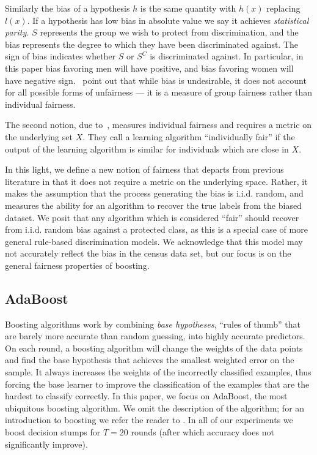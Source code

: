 \documentclass{article}
\begin{document}
Similarly the bias of a hypothesis $h$ is the same quantity with $h(x)$
replacing $l(x)$. If a hypothesis has low bias in absolute value we say it
achieves \emph{statistical parity.} $S$ represents the group we wish to protect
from discrimination, and the bias represents the degree to which they have been
discriminated against.  The sign of bias indicates whether $S$ or $S^C$ is
discriminated against.  In particular, in this paper bias favoring men will
have positive, and bias favoring women will have negative
sign.~\citet{DworkHPR12} point out that while bias is undesirable, it does not
account for all possible forms of unfairness --- it is a measure of group
fairness rather than individual fairness.

The second notion, due to~\citet{DworkHPR12},
measures individual fairness and requires a metric on the underlying set $X$.
They call a learning algorithm ``individually fair'' if the output of the
learning algorithm is similar for individuals which are close in $X$. 

In this light, we define a new notion of fairness that departs from
previous literature in that it does not require a metric on the underlying
space. Rather, it makes the assumption that the process generating the bias is
i.i.d. random, and measures the ability for an algorithm to recover the true
labels from the biased dataset. We posit that any algorithm which is considered
``fair'' should recover from i.i.d. random bias against a protected class,
as this is a special case of more general rule-based discrimination models. We
acknowledge that this model may not accurately reflect the bias in the census
data set, but our focus is on the general fairness properties of boosting.

\subsection{AdaBoost}

Boosting algorithms work by combining \emph{base hypotheses}, ``rules of
thumb'' that are barely more accurate than random guessing, into highly
accurate predictors.  On each round, a boosting algorithm will change the
weights of the data points and find the base hypothesis that achieves the
smallest weighted error on the sample.  It always increases the weights of the
incorrectly classified examples, thus forcing the base learner to improve the
classification of the examples that are the hardest to classify correctly. In
this paper, we focus on AdaBoost, the most ubiquitous boosting algorithm. 
We omit the description of the algorithm; for an introduction to boosting
we refer the reader to \citet{SchapireF12}.
In all of our experiments we
boost decision stumps for $T=20$ rounds (after which accuracy does not
significantly improve).
\end{document}

